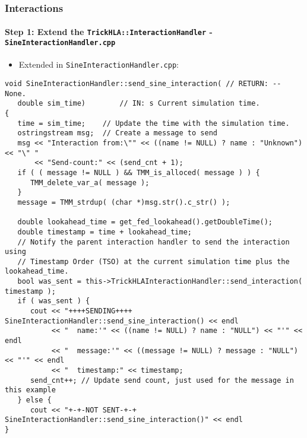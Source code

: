    \begin{frame}[fragile]
      \frametitle{Interactions}
      \framesubtitle{Step 1: Extend the \texttt{TrickHLA::InteractionHandler} - \texttt{SineInteractionHandler.cpp}}
      \begin{itemize}
         \item Extended in \texttt{SineInteractionHandler.cpp}:
      \end{itemize}
\begin{Verbatim}[frame=single, fontsize=\tiny]
void SineInteractionHandler::send_sine_interaction( // RETURN: -- None.
   double sim_time)        // IN: s Current simulation time.
{
   time = sim_time;    // Update the time with the simulation time.
   ostringstream msg;  // Create a message to send
   msg << "Interaction from:\"" << ((name != NULL) ? name : "Unknown") << "\" "
       << "Send-count:" << (send_cnt + 1);
   if ( ( message != NULL ) && TMM_is_alloced( message ) ) {
      TMM_delete_var_a( message );
   }
   message = TMM_strdup( (char *)msg.str().c_str() );

   double lookahead_time = get_fed_lookahead().getDoubleTime();
   double timestamp = time + lookahead_time;
   // Notify the parent interaction handler to send the interaction using
   // Timestamp Order (TSO) at the current simulation time plus the lookahead_time.
   bool was_sent = this->TrickHLAInteractionHandler::send_interaction( timestamp );
   if ( was_sent ) {
      cout << "++++SENDING++++ SineInteractionHandler::send_sine_interaction() << endl
           << "  name:'" << ((name != NULL) ? name : "NULL") << "'" << endl
           << "  message:'" << ((message != NULL) ? message : "NULL") << "'" << endl
           << "  timestamp:" << timestamp;
      send_cnt++; // Update send count, just used for the message in this example
   } else {
      cout << "+-+-NOT SENT-+-+ SineInteractionHandler::send_sine_interaction()" << endl         
}
\end{Verbatim}
   \end{frame}

